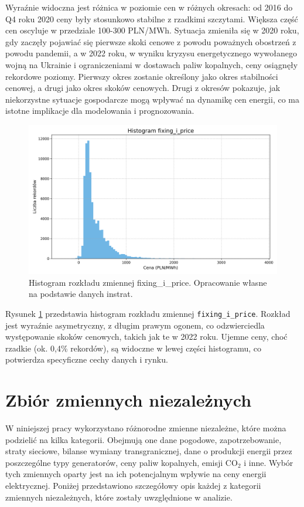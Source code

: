 Wyraźnie widoczna jest różnica w poziomie cen w różnych okresach: od 2016 do Q4 roku 2020 ceny były stosunkowo stabilne z rzadkimi szczytami. Większa część cen oscyluje w przedziale 100-300 PLN/MWh. Sytuacja zmieniła się w 2020 roku, gdy zaczęły pojawiać się pierwsze skoki cenowe z powodu poważnych obostrzeń z powodu pandemii, a w 2022 roku, w wyniku kryzysu energetycznego wywołanego wojną na Ukrainie i ograniczeniami w dostawach paliw kopalnych, ceny osiągnęły rekordowe poziomy. Pierwszy okres zostanie określony jako okres stabilności cenowej, a drugi jako okres skoków cenowych. Drugi z okresów pokazuje, jak niekorzystne sytuacje gospodarcze mogą wpływać na dynamikę cen energii, co ma istotne implikacje dla modelowania i prognozowania.

\begin{figure}
    \centering
    \includegraphics[width=\textwidth]{../plots/fixing_i_price_histogram.png}
    \caption{Histogram rozkładu zmiennej fixing\_i\_price. Opracowanie własne na podstawie danych instrat.}
    \label{fig:fixing-i-price-histogram}
\end{figure}

Rysunek \ref{fig:fixing-i-price-histogram} przedstawia histogram rozkładu zmiennej \texttt{fixing\_i\_price}. Rozkład jest wyraźnie asymetryczny, z długim prawym ogonem, co odzwierciedla występowanie skoków cenowych, takich jak te w 2022 roku. Ujemne ceny, choć rzadkie (ok. 0,4\% rekordów), są widoczne w lewej części histogramu, co potwierdza specyficzne cechy danych i rynku.

\section{Zbiór zmiennych niezależnych}
W niniejszej pracy wykorzystano różnorodne zmienne niezależne, które można podzielić na kilka kategorii. Obejmują one dane pogodowe, zapotrzebowanie, straty sieciowe, bilanse wymiany transgranicznej, dane o produkcji energii przez poszczególne typy generatorów, ceny paliw kopalnych, emisji CO$_2$ i inne. Wybór tych zmiennych oparty jest na ich potencjalnym wpływie na ceny energii elektrycznej. Poniżej przedstawiono szczegółowy opis każdej z kategorii zmiennych niezależnych, które zostały uwzględnione w analizie.

